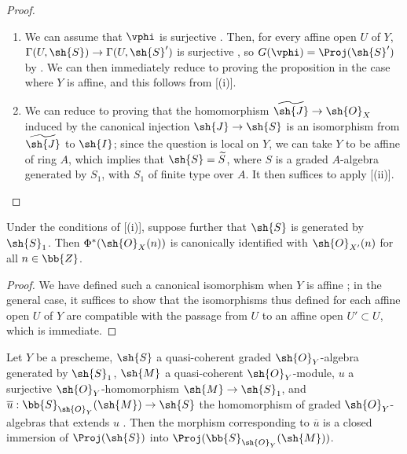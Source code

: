 \begin{proof}
\medskip\noindent
\begin{enumerate}
  \item[(i)] We can assume that $\vphi$ is surjective .
    Then, for every affine open $U$ of $Y$, $\Gamma(U,\sh{S})\to\Gamma(U,\sh{S}')$ is surjective , so $G(\vphi)=\Proj(\sh{S}')$ by .
    We can then immediately reduce to proving the proposition in the case where $Y$ is affine, and this follows from [(i)].
  \item[(ii)] We can reduce to proving that the homomorphism $\widetilde{\sh{J}}\to\sh{O}_X$ induced by the canonical injection $\sh{J}\to\sh{S}$ is an isomorphism from $\widetilde{\sh{J}}$ to $\sh{I}$;
    since the question is local on $Y$, we can take $Y$ to be affine of ring $A$, which implies that $\sh{S}=\widetilde{S}$, where $S$ is a graded $A$-algebra generated by $S_1$, with $S_1$ of finite type over $A$.
    It then suffices to apply [(ii)].
\end{enumerate}
\end{proof}

\begin{corollary}[3.6.3]
\label{II.3.6.3}
Under the conditions of [(i)], suppose further that $\sh{S}$ is generated by $\sh{S}_1$.
Then $\Phi^*(\sh{O}_X(n))$ is canonically identified with $\sh{O}_{X'}(n)$ for all $n\in\bb{Z}$.
\end{corollary}

\begin{proof}
We have defined such a canonical isomorphism when $Y$ is affine ;
in the general case, it suffices to show that the isomorphisms thus defined for each affine open $U$ of $Y$ are compatible with the passage from $U$ to an affine open $U'\subset U$, which is immediate.
\end{proof}

\begin{corollary}[3.6.4]
\label{II.3.6.4}
Let $Y$ be a prescheme, $\sh{S}$ a quasi-coherent graded $\sh{O}_Y$-algebra generated by $\sh{S}_1$, $\sh{M}$ a quasi-coherent $\sh{O}_Y$-module, $u$ a surjective $\sh{O}_Y$-homomorphism $\sh{M}\to\sh{S}_1$, and $\overline{u}:\bb{S}_{\sh{O}_Y}(\sh{M})\to\sh{S}$ the homomorphism of graded $\sh{O}_Y$-algebras that extends $u$ .
Then the morphism corresponding to $\overline{u}$ is a closed immersion of $\Proj(\sh{S})$ into $\Proj(\bb{S}_{\sh{O}_Y}(\sh{M}))$.
\end{corollary}

